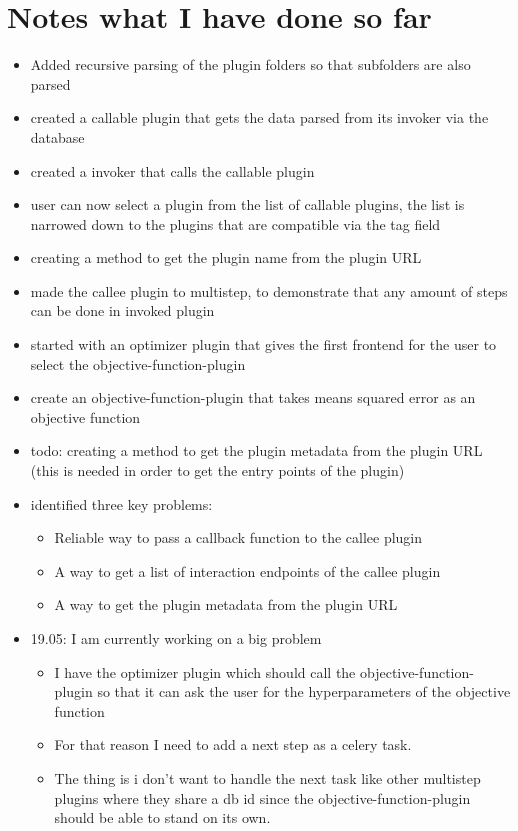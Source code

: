 \documentclass[
  a4paper,  %
  twoside,  %
  bibliography=totoc,
  headsepline,
  cleardoublepage=empty,
  parskip=half,
  draft=false
]{scrbook}
\begin{document}
\chapter{Notes what I have done so far}
\begin{itemize}
  \item Added recursive parsing of the plugin folders so that subfolders are also parsed
  \item created a callable plugin that gets the data parsed from its invoker via the database
  \item created a invoker that calls the callable plugin
  \item user can now select a plugin from the list of callable plugins, the list is narrowed down to the plugins that are compatible via the tag field
  \item creating a method to get the plugin name from the plugin URL
  \item made the callee plugin to multistep, to demonstrate that any amount of steps can be done in invoked plugin
  \item started with an optimizer plugin that gives the first frontend for the user to select the objective-function-plugin
  \item create an objective-function-plugin that takes means squared error as an objective function
  \item todo: creating a method to get the plugin metadata from the plugin URL (this is needed in order to get the entry points of the plugin)
  \item identified three key problems:
  \begin{itemize}
    \item Reliable way to pass a callback function to the callee plugin
    \item A way to get a list of interaction endpoints of the callee plugin
    \item A way to get the plugin metadata from the plugin URL
  \end{itemize}
  \item 19.05: I am currently working on a big problem
  \begin{itemize}
    \item I have the optimizer plugin which should call the objective-function-plugin so that it can ask the user for the hyperparameters of the objective function
    \item For that reason I need to add a next step as a celery task.
    \item The thing is i don't want to handle the next task like other multistep plugins where they share a db id since the objective-function-plugin should be able to stand on its own.

\end{itemize}
\end{itemize}
\end{document}
